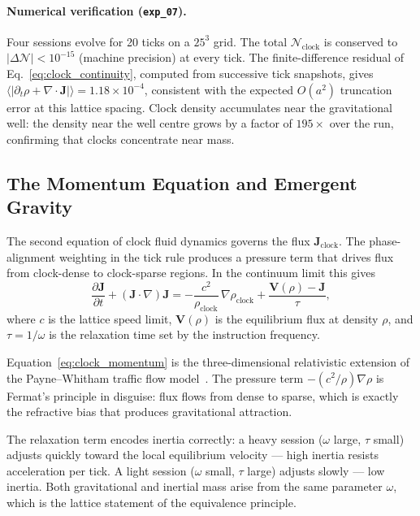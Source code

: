 \paragraph{Numerical verification (\texttt{exp\_07}).}
Four sessions evolve for 20 ticks on a $25^3$ grid.
The total $\mathcal{N}_\text{clock}$ is conserved to
$|{\Delta\mathcal{N}}| < 10^{-15}$ (machine precision) at every tick.
The finite-difference residual of Eq.~\eqref{eq:clock_continuity},
computed from successive tick snapshots, gives
$\langle|\partial_t\rho + \nabla\cdot\mathbf{J}|\rangle
= 1.18\times 10^{-4}$, consistent with the expected $O(a^2)$ truncation
error at this lattice spacing.
Clock density accumulates near the gravitational well: the density near
the well centre grows by a factor of $195\times$ over the run,
confirming that clocks concentrate near mass.

\subsection{The Momentum Equation and Emergent Gravity}
\label{subsec:momentum_eq}

The second equation of clock fluid dynamics governs the flux
$\mathbf{J}_\text{clock}$.
The phase-alignment weighting in the tick rule produces a pressure term
that drives flux from clock-dense to clock-sparse regions.
In the continuum limit this gives
\begin{equation}
    \frac{\partial \mathbf{J}}{\partial t}
        + (\mathbf{J}\cdot\nabla)\mathbf{J}
        = -\frac{c^2}{\rho_\text{clock}}\,\nabla\rho_\text{clock}
          + \frac{\mathbf{V}(\rho) - \mathbf{J}}{\tau},
    \label{eq:clock_momentum}
\end{equation}
where $c$ is the lattice speed limit, $\mathbf{V}(\rho)$ is the
equilibrium flux at density $\rho$, and $\tau = 1/\omega$ is the
relaxation time set by the instruction frequency.

Equation~\eqref{eq:clock_momentum} is the three-dimensional relativistic
extension of the Payne--Whitham traffic flow model~\cite{payne1971,
lighthill1955}.
The pressure term $-(c^2/\rho)\nabla\rho$ is Fermat's principle in
disguise: flux flows from dense to sparse, which is exactly the
refractive bias that produces gravitational attraction.

The relaxation term encodes inertia correctly: a heavy session
($\omega$ large, $\tau$ small) adjusts quickly toward the local
equilibrium velocity --- high inertia resists acceleration per tick.
A light session ($\omega$ small, $\tau$ large) adjusts slowly ---
low inertia.
Both gravitational and inertial mass arise from the same parameter
$\omega$, which is the lattice statement of the equivalence principle.

